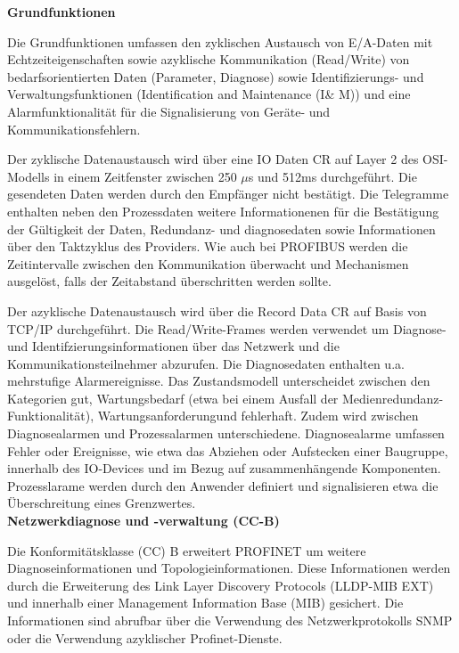 \textbf{Grundfunktionen}


Die Grundfunktionen umfassen den zyklischen Austausch von E/A-Daten mit Echtzeiteigenschaften sowie azyklische Kommunikation (Read/Write) von bedarfsorientierten Daten (Parameter, Diagnose) sowie Identifizierungs- und Verwaltungsfunktionen (Identification and Maintenance (I\& M)) und eine Alarmfunktionalität für die Signalisierung von Geräte- und Kommunikationsfehlern. 

Der zyklische Datenaustausch wird über eine IO Daten CR auf Layer 2 des OSI-Modells in einem Zeitfenster zwischen 250 $\mu $s und 512ms durchgeführt. Die gesendeten Daten werden durch den Empfänger nicht bestätigt. Die Telegramme enthalten neben den Prozessdaten weitere Informationenen für die Bestätigung der Gültigkeit der Daten, Redundanz- und diagnosedaten sowie Informationen über den Taktzyklus des Providers. Wie auch bei PROFIBUS werden die Zeitintervalle zwischen den Kommunikation überwacht und Mechanismen ausgelöst, falls der Zeitabstand überschritten werden sollte. 

Der azyklische Datenaustausch wird über die Record Data CR auf Basis von TCP/IP durchgeführt. Die Read/Write-Frames werden verwendet um Diagnose- und Identifzierungsinformationen über das Netzwerk und die Kommunikationsteilnehmer abzurufen. Die Diagnosedaten enthalten u.a. mehrstufige Alarmereignisse. Das Zustandsmodell unterscheidet zwischen den Kategorien \glqq gut\grqq , \glqq Wartungsbedarf (etwa bei einem Ausfall der Medienredundanz-Funktionalität)\grqq , \glqq Wartungsanforderung\grqq und \glqq fehlerhaft\grqq . Zudem wird zwischen Diagnosealarmen und Prozessalarmen unterschiedene. Diagnosealarme umfassen Fehler oder Ereignisse, wie etwa das Abziehen oder Aufstecken einer Baugruppe, innerhalb des IO-Devices und im Bezug auf zusammenhängende Komponenten. Prozesslarame werden durch den Anwender definiert und signalisieren etwa die Überschreitung eines Grenzwertes. \\


\textbf{Netzwerkdiagnose und -verwaltung (CC-B)}


Die Konformitätsklasse (CC) B erweitert PROFINET um weitere Diagnoseinformationen und Topologieinformationen. Diese Informationen werden durch die Erweiterung des Link Layer Discovery Protocols (LLDP-MIB EXT) und innerhalb einer Management Information Base (MIB) gesichert. Die Informationen sind abrufbar über die Verwendung des Netzwerkprotokolls SNMP oder die Verwendung azyklischer Profinet-Dienste. 

